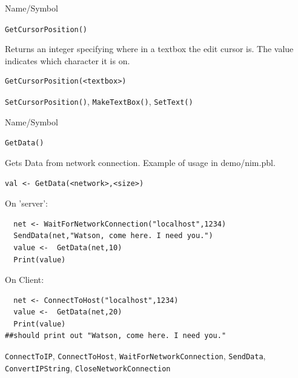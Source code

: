 \begin{desc}{Name/Symbol}
\item[Name/Symbol]	\verb+GetCursorPosition()+

\item[Description]	Returns an integer specifying where in a textbox the edit cursor is.  The value indicates which character it is on.

\item[Usage]
\begin{verbatim}
GetCursorPosition(<textbox>)
\end{verbatim}

\item[Example]	

\item[See Also]	\verb+SetCursorPosition()+, \verb+MakeTextBox()+, \verb+SetText()+
\end{desc}

\begin{desc}{Name/Symbol}
\item[Name/Symbol]	\verb+GetData()+

\item[Description]	Gets Data from network connection.  Example of
  usage in demo/nim.pbl.

\item[Usage]
\begin{verbatim}
val <- GetData(<network>,<size>)
\end{verbatim}

\item[Example]	

On 'server':
\begin{verbatim}
  net <- WaitForNetworkConnection("localhost",1234)
  SendData(net,"Watson, come here. I need you.")
  value <-  GetData(net,10)
  Print(value)

\end{verbatim}
On Client:
\begin{verbatim}
  net <- ConnectToHost("localhost",1234)
  value <-  GetData(net,20)
  Print(value)
##should print out "Watson, come here. I need you."
\end{verbatim}
\item[See Also]
  \verb+ConnectToIP+, \verb+ConnectToHost+, \verb+WaitForNetworkConnection+,
   \verb+SendData+, \verb+ConvertIPString+, \verb+CloseNetworkConnection+
\end{desc}




